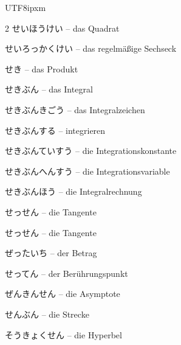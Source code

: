 \begin{CJK}{UTF8}{ipxm}
\begin{multicols}{2}
 {\footnotesize\color{black!70}せいほうけい} -- das Quadrat\dotfill\hyperref[e:198]{\pageref*{e:198}}\par
{} {\footnotesize\color{black!70}せいろっかくけい} -- das regelmäßige Sechseck\dotfill\hyperref[e:205]{\pageref*{e:205}}\par
{} {\footnotesize\color{black!70}せき} -- das Produkt\dotfill\hyperref[e:22]{\pageref*{e:22}}\par
{} {\footnotesize\color{black!70}せきぶん} -- das Integral\dotfill\hyperref[e:295]{\pageref*{e:295}}\par
{} {\footnotesize\color{black!70}せきぶんきごう} -- das Integralzeichen\dotfill\hyperref[e:289]{\pageref*{e:289}}\par
{} {\footnotesize\color{black!70}せきぶんする} -- integrieren\dotfill\hyperref[e:296]{\pageref*{e:296}}\par
{} {\footnotesize\color{black!70}せきぶんていすう} -- die Integrationskonstante\dotfill\hyperref[e:292]{\pageref*{e:292}}\par
{} {\footnotesize\color{black!70}せきぶんへんすう} -- die Integrationsvariable\dotfill\hyperref[e:291]{\pageref*{e:291}}\par
{} {\footnotesize\color{black!70}せきぶんほう} -- die Integralrechnung\dotfill\hyperref[e:286]{\pageref*{e:286}}\par
{} {\footnotesize\color{black!70}せっせん} -- die Tangente\dotfill\hyperref[e:224]{\pageref*{e:224}}\par
{} {\footnotesize\color{black!70}せっせん} -- die Tangente\dotfill\hyperref[e:279]{\pageref*{e:279}}\par
{} {\footnotesize\color{black!70}ぜったいち} -- der Betrag\dotfill\hyperref[e:53]{\pageref*{e:53}}\par
{} {\footnotesize\color{black!70}せってん} -- der Berührungspunkt\dotfill\hyperref[e:220]{\pageref*{e:220}}\par
{} {\footnotesize\color{black!70}ぜんきんせん} -- die Asymptote\dotfill\hyperref[e:271]{\pageref*{e:271}}\par
{} {\footnotesize\color{black!70}せんぶん} -- die Strecke\dotfill\hyperref[e:148]{\pageref*{e:148}}\par
{} {\footnotesize\color{black!70}そうきょくせん} -- die Hyperbel\dotfill\hyperref[e:315]{\pageref*{e:315}}\par

\end{multicols}
\end{CJK}
